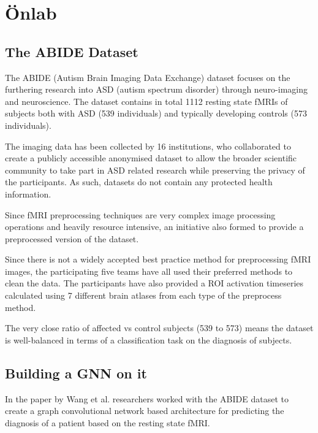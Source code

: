 \chapter{Önlab}

\section{The ABIDE Dataset}

The ABIDE (Autism Brain Imaging Data Exchange) dataset focuses on the furthering research into ASD (autism spectrum disorder) through neuro-imaging and neuroscience. The dataset contains in total 1112 resting state fMRIs of subjects both with ASD (539 individuals) and typically developing controls (573 individuals). 

The imaging data has been collected by 16 institutions, who collaborated to create a publicly accessible anonymised dataset to allow the broader scientific community to take part in ASD related research while preserving the privacy of the participants. As such, datasets do not contain any protected health information. 

Since fMRI preprocessing techniques are very complex image processing operations and heavily resource intensive, an initiative also formed to provide a preprocessed version of the dataset. 

Since there is not a widely accepted best practice method for preprocessing fMRI images, the participating five teams have all used their preferred methods to clean the data. The participants have also provided a ROI activation timeseries calculated using 7 different brain atlases from each type of the preprocess method. 

The very close ratio of affected vs control subjects (539 to 573) means the dataset is well-balanced in terms of a classification task on the diagnosis of subjects. 

\section{Building a GNN on it}

In the paper \cite{wang2021graph} by Wang et al. researchers worked with the ABIDE dataset to create a graph convolutional network based architecture for predicting the diagnosis of a patient based on the resting state fMRI. 